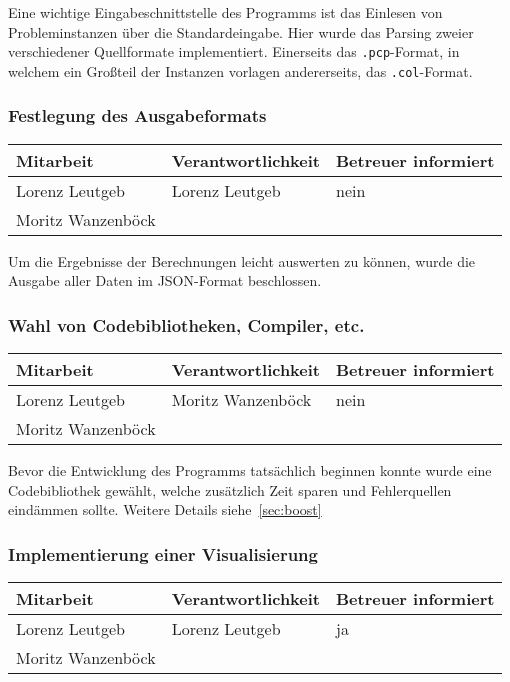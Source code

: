 Eine wichtige Eingabeschnittstelle des Programms ist das Einlesen von Probleminstanzen über die Standardeingabe. Hier wurde das Parsing zweier verschiedener Quellformate implementiert. Einerseits das \texttt{.pcp}-Format, in welchem ein Großteil der Instanzen vorlagen andererseits, das \texttt{.col}-Format.

\subsubsection{ Festlegung des Ausgabeformats}

\begin{center}
\begin{tabular}{lll}
	Mitarbeit & Verantwortlichkeit & Betreuer informiert \\
	\hline
	Lorenz Leutgeb & Lorenz Leutgeb & nein \\
	Moritz Wanzenböck & & \\
\end{tabular}
\end{center}

Um die Ergebnisse der Berechnungen leicht auswerten zu können, wurde die Ausgabe aller Daten im JSON-Format beschlossen.

\subsubsection{ Wahl von Codebibliotheken, Compiler, etc.}

\begin{center}
\begin{tabular}{lll}
	Mitarbeit & Verantwortlichkeit & Betreuer informiert \\
	\hline
	Lorenz Leutgeb & Moritz Wanzenböck & nein \\
	Moritz Wanzenböck & & \\
\end{tabular}
\end{center}

Bevor die Entwicklung des Programms tatsächlich beginnen konnte wurde eine Code\-bi\-bli\-othek gewählt, welche zusätzlich Zeit sparen und Fehlerquellen eindämmen sollte. Weitere Details siehe~\ref{sec:boost}

\subsubsection{ Implementierung einer Visualisierung}

\begin{center}
\begin{tabular}{lll}
	Mitarbeit & Verantwortlichkeit & Betreuer informiert \\
	\hline
	Lorenz Leutgeb & Lorenz Leutgeb & ja \\
	Moritz Wanzenböck & & \\
\end{tabular}
\end{center}

